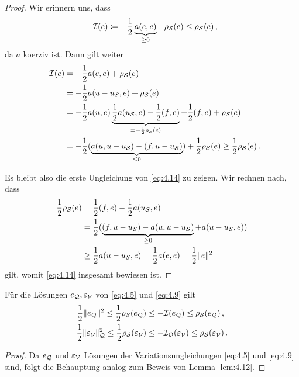 \begin{proof}
Wir erinnern uns, dass
\[
	-\mathcal I (e) \coloneqq - \frac 12 \underbrace{a(e,e)}_{\ge 0} + \rho_{\mathcal S} (e) \le \rho_{\mathcal S}(e) \, , 
\]
da $a$ koerziv ist. Dann gilt weiter
\begin{align*}
	-\mathcal I(e) & = - \frac 12 a(e,e) + \rho_{\mathcal S} (e) \\
	& = -\frac 1 2 a(u-u_{\mathcal S},e) + \rho_{\mathcal S} (e) \\
	& = -\frac 1 2 a(u,e) \underbrace{\frac 1 2 a(u_{\mathcal S},e)-\frac 1 2(f,e)}_{=-\frac 12 \rho_{\mathcal S}(e)} + \frac 1 2 (f,e)+\rho_{\mathcal S}(e) \\
	& = -\frac 12 (\underbrace{a(u,u-u_{\mathcal S})-(f,u-u_{\mathcal S})}_{\le 0}) + \frac 1 2\rho_{\mathcal S}(e) \ge \frac 1 2\rho_{\mathcal S}(e) \, .
\end{align*}

Es bleibt also die erste Ungleichung von \eqref{eq:4.14} zu zeigen. Wir rechnen nach, dass
\begin{align*}
	\frac 1 2 \rho_{\mathcal S} (e) &= \frac 1 2 (f,e)-\frac 1 2a(u_{\mathcal S},e) \\
	& = \frac 1 2 (\underbrace{(f,u-u_{\mathcal S}) - a(u,u-u_{\mathcal S})}_{\ge 0} + a(u-u_{\mathcal S},e)) \\
	& \ge \frac 1 2 a(u-u_{\mathcal S},e) =\frac 1 2 a(e,e) =  \frac 1 2 \lVert e\rVert^2 
\end{align*}
gilt, womit \eqref{eq:4.14} insgesamt bewiesen ist.
\end{proof}


\begin{kor}\label{kor:4.13}
Für die Lösungen $e_{\mathcal Q}, \varepsilon_{\mathcal V}$ von \eqref{eq:4.5} und \eqref{eq:4.9} gilt
\begin{align}\label{eq:4.15}
	\frac 12 \lVert e_{\mathcal Q}\rVert^2 \le \frac 12 \rho_{\mathcal S}(e_{\mathcal Q})& \le -\mathcal I (e_{\mathcal Q}) \le \rho_{\mathcal S}(e_{\mathcal Q}) \, ,\\
	\label{eq:4.16}
	\frac 12 \lVert \varepsilon_{\mathcal V}\rVert_{\mathcal Q}^2 \le \frac 12 \rho_{\mathcal S}(\varepsilon_{\mathcal V})& \le -\mathcal I_{\mathcal Q} (\varepsilon_{\mathcal V}) \le \rho_{\mathcal S}(\varepsilon_{\mathcal V})\, .
\end{align}
\end{kor}

\begin{proof}
Da $e_{\mathcal Q}$ und $\varepsilon_{\mathcal V}$ Lösungen der Variationsungleichungen \eqref{eq:4.5} und \eqref{eq:4.9} sind, folgt die Behauptung analog zum Beweis von Lemma \ref{lem:4.12}.
\end{proof}


